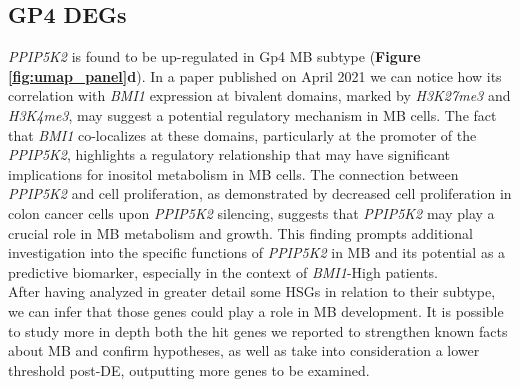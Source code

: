 \documentclass[10pt]{SelfArx} %
\begin{document}
\subsection{GP4 DEGs}\label{sec:GP4_DE}
\textit{PPIP5K2} is found to be up-regulated in Gp4 MB subtype (\textbf{Figure \ref{fig:umap_panel}d}). In a paper published on April 2021 \cite{badodi2021inositol} we can notice how its correlation with \textit{BMI1} expression at bivalent domains, marked by \textit{H3K27me3} and \textit{H3K4me3}, may suggest a potential regulatory mechanism in MB cells. The fact that \textit{BMI1} co-localizes at these domains, particularly at the promoter of the \textit{PPIP5K2}, highlights a regulatory relationship that may have significant implications for inositol metabolism in MB cells. The connection between \textit{PPIP5K2} and cell proliferation, as demonstrated by decreased cell proliferation in colon cancer cells upon \textit{PPIP5K2} silencing, suggests that \textit{PPIP5K2} may play a crucial role in MB metabolism and growth. This finding prompts additional investigation into the specific functions of \textit{PPIP5K2} in MB and its potential as a predictive biomarker, especially in the context of \textit{BMI1}-High patients.\\

After having analyzed in greater detail some HSGs in relation to their subtype, we can infer that those genes could play a role in MB development. It is possible to study more in depth both the hit genes we reported to strengthen known facts about MB and confirm hypotheses, as well as take into consideration a lower threshold post-DE, outputting more genes to be examined.
\end{document}
